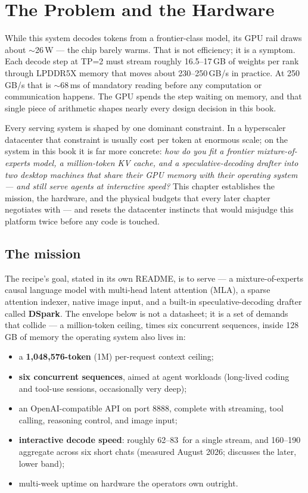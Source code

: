 \chapter{The Problem and the Hardware}
\label{ch:problem}

While this system decodes tokens from a frontier-class model, its GPU rail
draws about $\sim$26\,W --- the chip barely warms. That is not efficiency;
it is a symptom. Each decode step at TP=2 must stream roughly
16.5--17\,GB of weights per rank through LPDDR5X memory that moves about
230--250\,GB/s in practice. At 250\,GB/s that is $\sim$68\,ms of mandatory
reading before any computation or communication happens. The GPU spends the
step waiting on memory, and that single piece of arithmetic shapes nearly
every design decision in this book.

Every serving system is shaped by one dominant constraint. In a hyperscaler
datacenter that constraint is usually cost per token at enormous scale; on
the system in this book it is far more concrete: \emph{how do you fit a
frontier mixture-of-experts model, a million-token KV cache, and a
speculative-decoding drafter into two desktop machines that share their GPU
memory with their operating system --- and still serve agents at interactive
speed?} This chapter establishes the mission, the hardware, and the physical
budgets that every later chapter negotiates with --- and resets the
datacenter instincts that would misjudge this platform twice before any
code is touched.

\section{The mission}
\label{sec:problem:mission}

The recipe's goal, stated in its own README, is to serve
\textbf{} --- a
mixture-of-experts causal language model with multi-head latent attention
(MLA), a sparse attention indexer, native image input, and a built-in
speculative-decoding drafter called \textbf{DSpark}. The envelope below is
not a datasheet; it is a set of demands that collide --- a million-token
ceiling, times six concurrent sequences, inside 128\,GB of memory the
operating system also lives in:

\begin{itemize}
  \item a \textbf{1{,}048{,}576-token} (1M) per-request context ceiling;
  \item \textbf{six concurrent sequences}, aimed at agent workloads
    (long-lived coding and tool-use sessions, occasionally very deep);
  \item an OpenAI-compatible API on port 8888, complete with streaming, tool
    calling, reasoning control, and image input;
  \item \textbf{interactive decode speed}: roughly 62--83\,\tokspersec{} for a
    single stream, and 160--190\,\tokspersec{} aggregate across six short chats
    (measured August 2026;  discusses the later, lower band);
  \item multi-week uptime on hardware the operators own outright.
\end{itemize}

